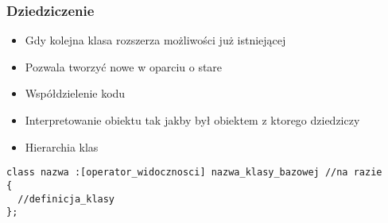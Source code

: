 \documentclass[10pt]{beamer}
\begin{document}
\begin{frame}[fragile]
  \frametitle{Dziedziczenie}
  \begin{itemize}
    \item Gdy kolejna klasa rozszerza możliwości już istniejącej
    \item Pozwala tworzyć nowe w oparciu o stare
    \item Współdzielenie kodu
    \item Interpretowanie obiektu tak jakby był obiektem z ktorego dziedziczy
    \item Hierarchia klas
  \end{itemize}
  
  \begin{lstlisting}
class nazwa :[operator_widocznosci] nazwa_klasy_bazowej //na razie
{
  //definicja_klasy
};
\end{lstlisting}
\end{frame}
\end{document}
